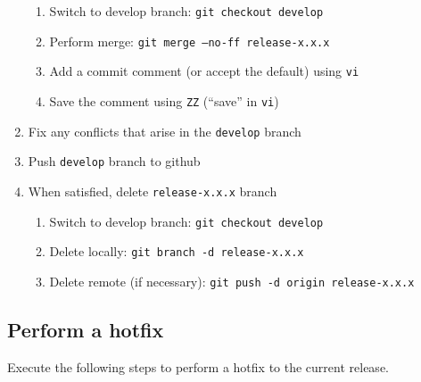 \documentclass{article}
\begin{document}
\begin{enumerate}
\begin{enumerate}
	\item Switch to develop branch: \texttt{git checkout develop}

    \item Perform merge: \texttt{git merge --no-ff release-x.x.x}
	
	\item Add a commit comment (or accept the default) using \texttt{vi} 
	
	\item Save the comment using \texttt{ZZ} (``save'' in \texttt{vi})

  \end{enumerate}
  \item Fix any conflicts that arise in the \texttt{develop} branch
  
  \item Push \texttt{develop} branch to github
  
  \item When satisfied, delete \texttt{release-x.x.x} branch
  \begin{enumerate}

    \item Switch to develop branch: \texttt{git checkout develop}

    \item Delete locally: \texttt{git branch -d release-x.x.x}

    \item Delete remote (if necessary): \texttt{git push -d origin release-x.x.x} 

  \end{enumerate}
  
\end{enumerate}
  

\subsection{Perform a hotfix} 
\label{sec:hotfix}

Execute the following steps to perform a hotfix to the current release.
\end{document}
